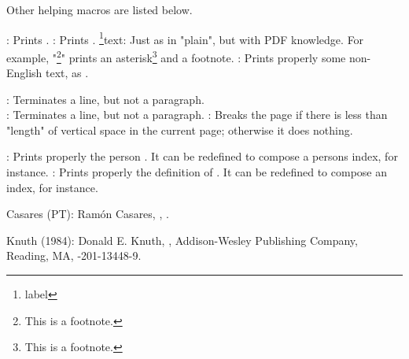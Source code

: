 Other helping macros are listed below.

\command\todayiso: Prints \todayiso.
\command\QED: Prints \QED.
\command\footnote{label}{text}: Just as in "plain",
 but with PDF knowledge.
 For example, "\footnote*{This is a footnote.}" prints
 an asterisk\footnote*{This is a footnote.} and a footnote.
\command{}: Prints properly some
 non-English text, as .

\command\newline: Terminates a line, but not a paragraph.
\command\\: Terminates a line, but not a paragraph.
\command{}: Breaks the page if there is
 less than "length" of vertical space in the current page;
 otherwise it does nothing.

\command{}: Prints properly the person .
 It can be redefined to compose a persons index, for instance.
\command{}: Prints properly
 the definition of .
 It can be redefined to compose an index, for instance.



\biblabel Casares (PT):
Ramón Casares,
,
.

\biblabel Knuth (1984):
Donald E. Knuth,
,
Addison-Wesley Publishing Company, Reading, MA,
-201-13448-9.





\bye
